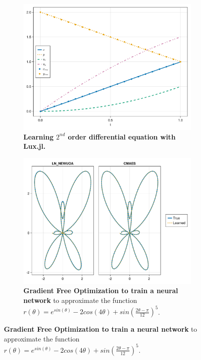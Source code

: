 \inputminted[linenos, breaklines, fontsize=\scriptsize, frame=single, framesep=10pt]{julia}{../code/diffeq.jl}

\begin{figure}
  \centering
  \begin{subfigure}[c]{0.48\linewidth}
    \centering
    \includegraphics[width=\textwidth]{../figures/lux/diffeq_plot.pdf}
    \caption{\textbf{Learning $2^{nd}$ order differential equation with Lux.jl.}}
    \label{fig:lux_diffeq_plot}
  \end{subfigure}
  \hfill
  \begin{subfigure}[c]{0.48\linewidth}
    \centering
    \includegraphics[width=\textwidth]{../figures/lux/gfopt_plot.pdf}
    \caption{\textbf{Gradient Free Optimization to train a neural network} to approximate the function $r(\theta) = e^{sin(\theta)} - 2cos(4\theta) + sin\left(\frac{2\theta - \pi}{12}\right)^5$.}
    \label{fig:lux_gfopt_plot}
  \end{subfigure}
\end{figure}

